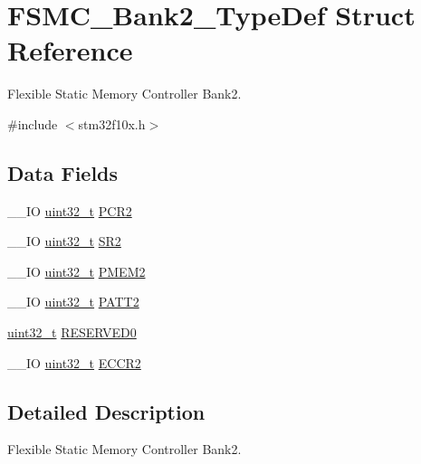 \hypertarget{struct_f_s_m_c___bank2___type_def}{\section{F\-S\-M\-C\-\_\-\-Bank2\-\_\-\-Type\-Def Struct Reference}
\label{struct_f_s_m_c___bank2___type_def}
}


Flexible Static Memory Controller Bank2.  




{\ttfamily \#include $<$stm32f10x.\-h$>$}

\subsection*{Data Fields}
\begin{DoxyCompactItemize}
\item 
\-\_\-\-\_\-\-I\-O \hyperlink{stdint_8h_a435d1572bf3f880d55459d9805097f62}{uint32\-\_\-t} \hyperlink{struct_f_s_m_c___bank2___type_def_ad1eabc89a4eadb5cc6a42c1e39a39ff8}{P\-C\-R2}
\item 
\-\_\-\-\_\-\-I\-O \hyperlink{stdint_8h_a435d1572bf3f880d55459d9805097f62}{uint32\-\_\-t} \hyperlink{struct_f_s_m_c___bank2___type_def_a38ad7403e05c899dc266cf47f932cc8f}{S\-R2}
\item 
\-\_\-\-\_\-\-I\-O \hyperlink{stdint_8h_a435d1572bf3f880d55459d9805097f62}{uint32\-\_\-t} \hyperlink{struct_f_s_m_c___bank2___type_def_a29b2b75e74520e304e31c18cf9e4a7f8}{P\-M\-E\-M2}
\item 
\-\_\-\-\_\-\-I\-O \hyperlink{stdint_8h_a435d1572bf3f880d55459d9805097f62}{uint32\-\_\-t} \hyperlink{struct_f_s_m_c___bank2___type_def_a9b2c273e4b84f24efbd731bd4ba76a84}{P\-A\-T\-T2}
\item 
\hyperlink{stdint_8h_a435d1572bf3f880d55459d9805097f62}{uint32\-\_\-t} \hyperlink{struct_f_s_m_c___bank2___type_def_ac0433330a92f2bd04812384f63bb4a52}{R\-E\-S\-E\-R\-V\-E\-D0}
\item 
\-\_\-\-\_\-\-I\-O \hyperlink{stdint_8h_a435d1572bf3f880d55459d9805097f62}{uint32\-\_\-t} \hyperlink{struct_f_s_m_c___bank2___type_def_afebea17b3ac79d86ad59ce299ab5dd83}{E\-C\-C\-R2}
\end{DoxyCompactItemize}


\subsection{Detailed Description}
Flexible Static Memory Controller Bank2. 

